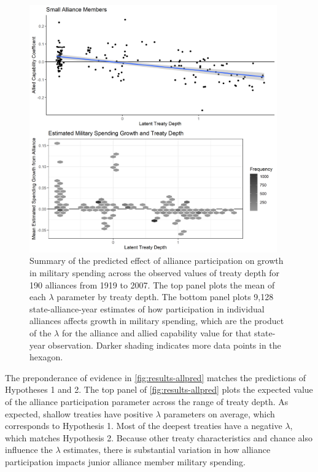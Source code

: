 \documentclass[12pt]{article}
\begin{document}
\begin{figure}[htbp]
	\centering
		\includegraphics[width=0.95\textwidth]{../figures/results-allpred.png}
	\caption{Summary of the predicted effect of alliance participation on growth in military spending across the observed values of treaty depth for 190 alliances from 1919 to 2007. The top panel plots the mean of each $\lambda$ parameter by treaty depth. The bottom panel plots 9,128 state-alliance-year estimates of how participation in individual alliances affects growth in military spending, which are the product of the $\lambda$ for the alliance and allied capability value for that state-year observation. Darker shading indicates more data points in the hexagon.}
	\label{fig:results-allpred}
\end{figure}


The preponderance of evidence in \autoref{fig:results-allpred} matches the predictions of Hypotheses 1 and 2.
The top panel of \autoref{fig:results-allpred} plots the expected value of the alliance participation parameter across the range of treaty depth. 
As expected, shallow treaties have positive $\lambda$ parameters on average, which corresponds to Hypothesis 1. 
Most of the deepest treaties have a negative $\lambda$, which matches Hypothesis 2. 
Because other treaty characteristics and chance also influence the $\lambda$ estimates, there is substantial variation in how alliance participation impacts junior alliance member military spending. 
\end{document}
